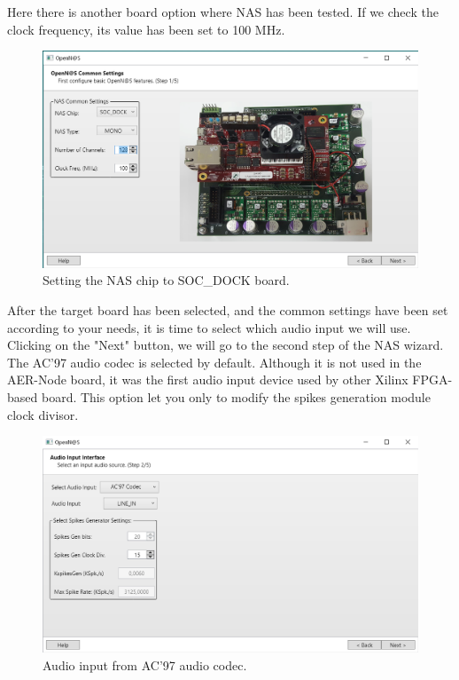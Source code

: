 Here there is another board option where NAS has been tested. If we check the clock frequency, its value has been set to 100 MHz.

\begin{figure}[H]
\centering
\includegraphics[width=1\textwidth]{images/Img15_VS_Step1_bis.PNG}
\caption{\label{fig:OpenNAS_s1}Setting the NAS chip to SOC\_DOCK board.}
\end{figure}

After the target board has been selected, and the common settings have been set according to your needs, it is time to select which audio input we will use. Clicking on the "Next" button, we will go to the second step of the NAS wizard.\\

The AC'97 audio codec is selected by default. Although it is not used in the AER-Node board, it was the first audio input device used by other Xilinx FPGA-based board. This option let you only to modify the spikes generation module clock divisor.

\begin{figure}[H]
\centering
\includegraphics[width=1\textwidth]{images/Img16_S2_SelectInput.PNG}
\caption{\label{fig:OpenNAS_s2_ac97}Audio input from AC'97 audio codec.}
\end{figure}


